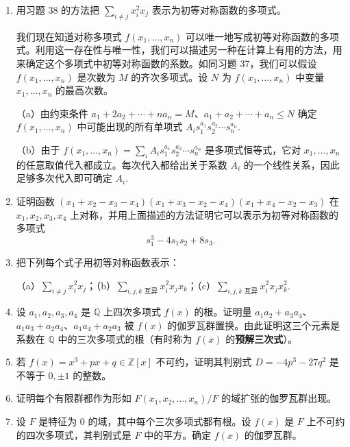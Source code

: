 \begin{enumerate}
（a）\((x_1-x_2)^2\)；（b）\(x_1^2+x_2^2+x_3^2\)；（c）\(x_1^2x_2^2+x_1^2x_3^2+x_2^2x_3^2\).

\item 用习题 38 的方法把 \(\sum_{i \neq j}x_i^2x_j\) 表示为初等对称函数的多项式。

\noindent 我们现在知道对称多项式 \(f(x_1, \ldots, x_n)\) 可以唯一地写成初等对称函数的多项式。利用这一存在性与唯一性，我们可以描述另一种在计算上有用的方法，用来确定这个多项式中初等对称函数的系数。如同习题 37，我们可以假设 \(f(x_1, \ldots, x_n)\) 是次数为 \(M\) 的齐次多项式。设 \(N\) 为 \(f(x_1, \ldots, x_n)\) 中变量 \(x_1, \ldots, x_n\) 的最高次数。

（a）由约束条件 \(a_1+2a_2+\cdots+na_n = M\)、\(a_1+a_2+\cdots+a_n \leq N\) 确定 \(f(x_1, \ldots, x_n)\) 中可能出现的所有单项式 \(A_is_1^{a_1}s_2^{a_2}\cdots s_n^{a_n}\).

（b）由于 \(f(x_1, \ldots, x_n) = \sum_iA_is_1^{a_1}s_2^{a_2}\cdots s_n^{a_n}\) 是多项式恒等式，它对 \(x_1, \ldots, x_n\) 的任意取值代入都成立。每次代入都给出关于系数 \(A_i\) 的一个线性关系，因此足够多次代入即可确定 \(A_i\).

\item 证明函数 \((x_1+x_2-x_3-x_4)(x_1+x_3-x_2-x_4)(x_1+x_4-x_2-x_3)\) 在 \(x_1, x_2, x_3, x_4\) 上对称，并用上面描述的方法证明它可以表示为初等对称函数的多项式
\[
s_1^3-4s_1s_2+8s_3.
\]

\item 把下列每个式子用初等对称函数表示：

（a）\(\sum_{i \neq j}x_i^2x_j\)；（b）\(\sum_{i,j,k\text{ 互异}}x_i^2x_jx_k\)；（c）\(\sum_{i,j,k\text{ 互异}}x_i^2x_jx_k^2\).

\item 设 \(a_1, a_2, a_3, a_4\) 是 \(\mathbb{Q}\) 上四次多项式 \(f(x)\) 的根。证明量 \(a_1a_2+a_3a_4\)、\(a_1a_3+a_2a_4\)、\(a_1a_4+a_2a_3\) 被 \(f(x)\) 的伽罗瓦群置换。由此证明这三个元素是系数在 \(\mathbb{Q}\) 中的三次多项式的根（有时称为 \(f(x)\) 的\textbf{预解三次式}）。

\item 若 \(f(x) = x^3+px+q \in \mathbb{Z}[x]\) 不可约，证明其判别式 \(D = -4p^3-27q^2\) 是不等于 \(0, \pm 1\) 的整数。

\item 证明每个有限群都作为形如 \(F(x_1, x_2, \ldots, x_n)/F\) 的域扩张的伽罗瓦群出现。

\item 设 \(F\) 是特征为 0 的域，其中每个三次多项式都有根。设 \(f(x)\) 是 \(F\) 上不可约的四次多项式，其判别式是 \(F\) 中的平方。确定 \(f(x)\) 的伽罗瓦群。


\end{enumerate}

